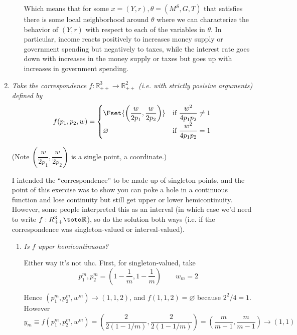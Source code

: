 \documentclass{article}
\begin{document}
\begin{enumerate}[1.]
\begin{enumerate}[a)]
      Which means that for some $x = (Y, r), \theta = (M^S, G, T)$ that satisfies  there is some local neighborhood around $\theta$ where we can characterize the behavior of $(Y, r)$ with respect to each of the variables in $\theta$. In particular, income reacts positively to increases money supply or government spending but negatively to taxes, while the interest rate goes down with increases in the money supply or taxes but goes up with increases in government spending.
    \end{enumerate}

  \item {\itshape
    Take the correspondence $f: \mathbb{R}^3_{++} \to \mathbb{R}^2_{++}$ (i.e. with strictly posisive arguments) defined by
    \[
      f(p_1, p_2, w)
      =
      \begin{cases}
        \Fset{
          \left(\dfrac{w}{2p_1}, \dfrac{w}{2 p_2}\right)
        }
          & \text{if } \dfrac{w^2}{4 p_1 p_2} \ne 1 \\[6pt]
        \varnothing
          & \text{if } \dfrac{w^2}{4 p_1 p_2} = 1
      \end{cases}
    \]

    (Note $\left(\dfrac{w}{2p_1}, \dfrac{w}{2 p_2}\right)$ is a single point, a coordinate.)}

    \solution I intended the ``correspondence'' to be made up of singleton points, and the point of this exercise was to show you can poke a hole in a continuous function and lose continuity but still get upper or lower hemicontinuity. However, some people interpreted this as an interval (in which case we'd need to write $f: R^{3}_{++} \toto \mathbb{R}$), so do the solution both ways (i.e. if the correspondence was singleton-valued or interval-valued).

    \begin{enumerate}
      \item \textit{Is $f$ upper hemicontinuous?}

        \solution Either way it's not uhc. First, for singleton-valued, take
        \[
          p^m_1, p^m_2
          =
          \left(
            1 - \dfrac{1}{m},
            1 - \dfrac{1}{m}
          \right)
          \quad\quad
          w_m = 2
        \]

        Hence $(p^m_1, p^m_2, w^m) \to (1, 1, 2)$, and $f(1, 1, 2) = \varnothing$ because $2^2 / 4 = 1$. However
        \[
          y_m
          \equiv
          f(p^m_1, p^m_2, w^m)
          =
          \left(\dfrac{2}{2 (1 - 1 / m)}, \dfrac{2}{2 (1 - 1 / m)}\right)
          =
          \left(\dfrac{m}{m - 1}, \dfrac{m}{m - 1}\right)
          \to
          (1, 1)
        \]


\end{enumerate}
\end{enumerate}
\end{document}
